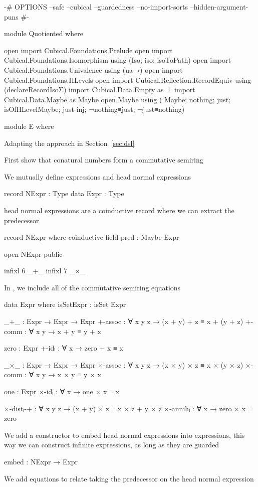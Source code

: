 \begin{code}[hide]
{-# OPTIONS
  --safe
  --cubical
  --guardedness
  --no-import-sorts
  --hidden-argument-puns #-}

module Quotiented where

open import Cubical.Foundations.Prelude
open import Cubical.Foundations.Isomorphism using (Iso; iso; isoToPath)
open import Cubical.Foundations.Univalence using (ua→)
open import Cubical.Foundations.HLevels
open import Cubical.Reflection.RecordEquiv using (declareRecordIsoΣ)
import Cubical.Data.Empty as ⊥
import Cubical.Data.Maybe as Maybe
open Maybe
  using
    ( Maybe; nothing; just;
      isOfHLevelMaybe; just-inj; ¬nothing≡just; ¬just≡nothing)

module E where
\end{code}
Adapting the approach in Section~\ref{sec:dsl}

First show that conatural numbers form a commutative semiring

We mutually define expressions and head normal expressions
\begin{code}
  record NExpr : Type
  data Expr : Type
\end{code}
head normal expressions are a coinductive record where we can extract the
predecessor
\begin{code}
  record NExpr where
    coinductive
    field pred : Maybe Expr
\end{code}
\begin{code}[hide]
  open NExpr public

  infixl 6 _+_
  infixl 7 _×_
\end{code}
In , we include all of the commutative semiring equations
\begin{code}
  data Expr where
    isSetExpr : isSet Expr

    _+_ : Expr → Expr → Expr
    +-assoc : ∀ x y z → (x + y) + z ≡ x + (y + z)
    +-comm : ∀ x y → x + y ≡ y + x

    zero : Expr
    +-idₗ : ∀ x → zero + x ≡ x

    _×_ : Expr → Expr → Expr
    ×-assoc : ∀ x y z → (x × y) × z ≡ x × (y × z)
    ×-comm : ∀ x y → x × y ≡ y × x

    one : Expr
    ×-idₗ : ∀ x → one × x ≡ x

    ×-distₗ-+ : ∀ x y z → (x + y) × z ≡ x × z + y × z
    ×-annihₗ : ∀ x → zero × x ≡ zero
\end{code}
We add a constructor to embed head normal expressions into expressions, this way
we can construct infinite expressions, as long as they are guarded
\begin{code}
    embed : NExpr → Expr
\end{code}
We add equations to relate taking the predecessor on the head normal expression

